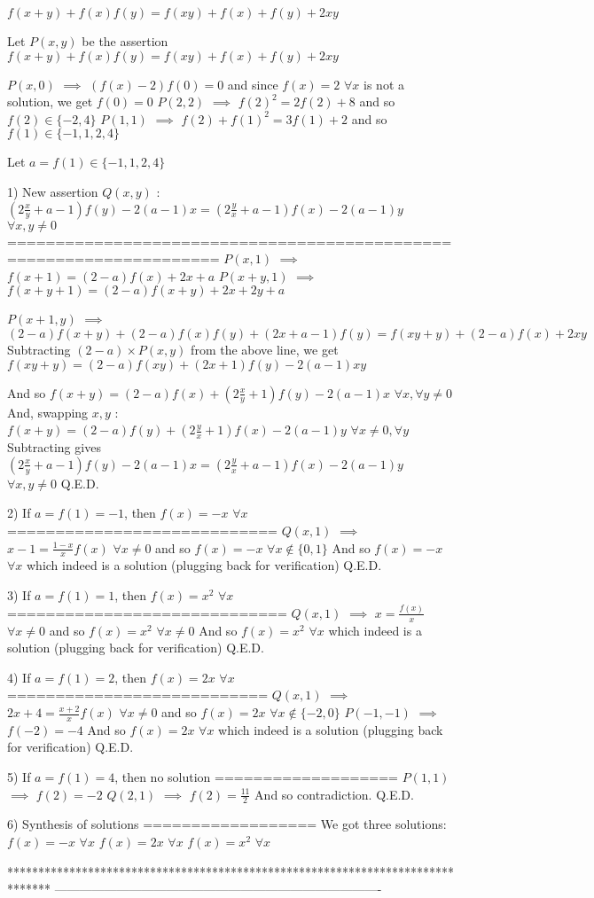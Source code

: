 \begin{solution}
	\begin{tcolorbox}$f(x+y)+f(x)f(y)=f(xy)+f(x)+f(y)+2xy$\end{tcolorbox}
Let $P(x,y)$ be the assertion $f(x+y)+f(x)f(y)=f(xy)+f(x)+f(y)+2xy$

$P(x,0)$ $\implies$ $(f(x)-2)f(0)=0$ and since $f(x)=2$ $\forall x$ is not a solution, we get $f(0)=0$
$P(2,2)$ $\implies$ $f(2)^2=2f(2)+8$ and so $f(2)\in\{-2,4\}$
$P(1,1)$ $\implies$ $f(2)+f(1)^2=3f(1)+2$ and so $f(1)\in\{-1,1,2,4\}$

Let $a=f(1)\in\{-1,1,2,4\}$

1) New assertion $Q(x,y)$ : $(2\frac xy+a-1)f(y)-2(a-1)x=(2\frac yx+a-1)f(x)-2(a-1)y$ $\forall x,y\ne 0$
====================================================================
$P(x,1)$ $\implies$ $f(x+1)=(2-a)f(x)+2x+a$
$P(x+y,1)$ $\implies$ $f(x+y+1)=(2-a)f(x+y)+2x+2y+a$

$P(x+1,y)$ $\implies$ $(2-a)f(x+y)+(2-a)f(x)f(y)+(2x+a-1)f(y)=f(xy+y)+(2-a)f(x)+2xy$
Subtracting $(2-a)\times P(x,y)$ from the above line, we get $f(xy+y)=(2-a)f(xy)+(2x+1)f(y)-2(a-1)xy$

And so $f(x+y)=(2-a)f(x)+(2\frac xy+1)f(y)-2(a-1)x$ $\forall x,\forall y\ne 0$
And, swapping $x,y$ : $f(x+y)=(2-a)f(y)+(2\frac yx+1)f(x)-2(a-1)y$ $\forall x\ne 0,\forall y$
Subtracting gives $(2\frac xy+a-1)f(y)-2(a-1)x=(2\frac yx+a-1)f(x)-2(a-1)y$ $\forall x,y\ne 0$
Q.E.D.

2) If $a=f(1)=-1$, then  $f(x)=-x$ $\forall x$
============================
$Q(x,1)$ $\implies$ $x-1=\frac{1-x}xf(x)$ $\forall x\ne 0$ and so $f(x)=-x$ $\forall x\notin\{0,1\}$
And so $f(x)=-x$ $\forall x$ which indeed is a solution (plugging back for verification)
Q.E.D.

3) If $a=f(1)=1$, then $f(x)=x^2$ $\forall x$
=============================
$Q(x,1)$ $\implies$ $x=\frac {f(x)}x$ $\forall x\ne 0$ and so $f(x)=x^2$ $\forall x\ne 0$
And so $f(x)=x^2$ $\forall x$ which indeed is a solution (plugging back for verification)
Q.E.D.

4) If $a=f(1)=2$, then $f(x)=2x$ $\forall x$
===========================
$Q(x,1)$ $\implies$ $2x+4=\frac{x+2}xf(x)$ $\forall x\ne 0$ and so $f(x)=2x$ $\forall x\notin\{-2,0\}$
$P(-1,-1)$ $\implies$ $f(-2)=-4$
And so $f(x)=2x$ $\forall x$ which indeed is a solution (plugging back for verification)
Q.E.D.

5) If $a=f(1)=4$, then no solution
===================
$P(1,1)$ $\implies$ $f(2)=-2$ 
$Q(2,1)$ $\implies$ $f(2)=\frac {11}2$
And so contradiction.
Q.E.D.

6) Synthesis of solutions
==================
We got three solutions:
$f(x)=-x$ $\forall x$
$f(x)=2x$ $\forall x$
$f(x)=x^2$ $\forall x$
\end{solution}
*******************************************************************************
-------------------------------------------------------------------------------

